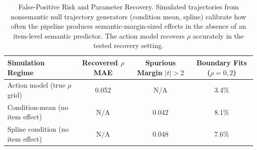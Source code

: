\begin{table}[htbp]
\centering
\caption{False-Positive Risk and Parameter Recovery. Simulated trajectories from nonsemantic null trajectory generators (condition mean, spline) calibrate how often the pipeline produces semantic-margin-sized effects in the absence of an item-level semantic predictor. The action model recovers $\rho$ accurately in the tested recovery setting.}
\label{tab:false-positive}
\begin{tabular}{lccc}
\toprule
Simulation Regime & Recovered $\rho$ MAE & Spurious Margin $|t| > 2$ & Boundary Fits ($\rho=0, 2$) \\
\midrule
Action model (true $\rho$ grid) & 0.052 & N/A & 3.4\% \\
Condition-mean (no item effect) & N/A & 0.042 & 8.1\% \\
Spline condition (no item effect) & N/A & 0.048 & 7.6\% \\
\bottomrule
\end{tabular}
\end{table}
